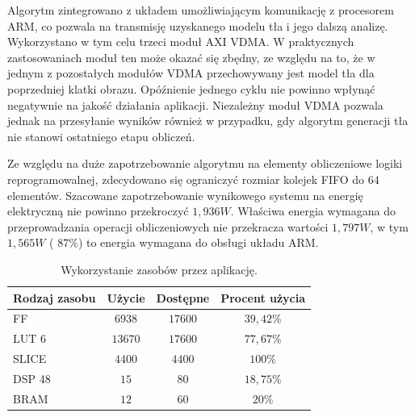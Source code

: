 Algorytm zintegrowano z układem umożliwiającym komunikację z procesorem ARM, co pozwala na transmisję uzyskanego modelu tła i jego dalszą analizę. 
Wykorzystano w tym celu trzeci moduł AXI VDMA.
W praktycznych zastosowaniach moduł ten może okazać się zbędny, ze względu na to, że w jednym z pozostałych modułów VDMA przechowywany jest model tła dla poprzedniej klatki obrazu. 
Opóźnienie jednego cyklu nie powinno wpłynąć negatywnie na jakość działania aplikacji. 
Niezależny moduł VDMA pozwala jednak na przesyłanie wyników również w przypadku, gdy algorytm generacji tła nie stanowi ostatniego etapu obliczeń.


Ze względu na duże zapotrzebowanie algorytmu na elementy obliczeniowe logiki reprogramowalnej, zdecydowano się ograniczyć rozmiar kolejek FIFO do $64$ elementów.
Szacowane zapotrzebowanie wynikowego systemu na energię elektryczną nie powinno przekroczyć $1,936W$. Właściwa energia wymagana do przeprowadzania operacji obliczeniowych nie przekracza wartości $1,797W$, w tym $1,565W$ ( $87\%$) to energia wymagana do obsługi układu ARM.


\begin{table}[!htb]
	\caption{Wykorzystanie zasobów przez aplikację.}
	\centering
	\label{tab;background-model-utilization}
	\begin{tabular}{|l|c|c|c|}
		\hline
		\textbf{Rodzaj zasobu} & \textbf{Użycie} & \textbf{Dostępne} & \textbf{Procent użycia}      \\ \hline
		FF                     & $6938$            & $17600$             & $39,42\%$                 \\ \hline
		LUT 6                  & $13670$            & $17600$             & $77,67\%$                 \\ \hline
		SLICE                  & $4400$            & $4400$             & $100\%$                 \\ \hline
		DSP 48                 & $15$               & $80$                & $18,75\%$                    \\ \hline
		BRAM                   & $12$               & $60$                & $20\%$                   \\ \hline
	\end{tabular}
\end{table}


